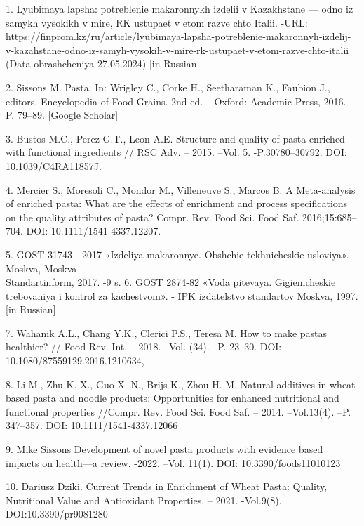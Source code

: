 \begin{noparindent}

1. Lyubimaya lapsha: potreblenie makaronnykh izdelii v Kazakhstane ---
odno iz samykh vysokikh v mire, RK ustupaet v etom razve chto Italii.
-URL:
https://finprom.kz/ru/article/lyubimaya-lapsha-potreblenie-makaronnyh-izdelij-v-kazahstane-odno-iz-samyh-vysokih-v-mire-rk-ustupaet-v-etom-razve-chto-italii
\\(Data obrashcheniya 27.05.2024) {[}in Russian{]}

2. Sissons M. Pasta. In: Wrigley C., Corke H., Seetharaman K., Faubion
J., editors. Encyclopedia of Food Grains. 2nd ed. -- Oxford: Academic
Press, 2016. - P. 79--89. {[}Google Scholar{]}

3. Bustos M.C., Perez G.T., Leon A.E. Structure and quality of pasta
enriched with functional ingredients // RSC Adv. -- 2015. --Vol. 5.
-P.30780--30792. DOI: 10.1039/C4RA11857J.

4. Mercier S., Moresoli C., Mondor M., Villeneuve S., Marcos B. A
Meta-analysis of enriched pasta: What are the effects of enrichment and
process specifications on the quality attributes of pasta? Compr. Rev.
Food Sci. Food Saf. 2016;15:685--704. DOI: 10.1111/1541-4337.12207.

5. GOST 31743---2017 «Izdeliya makaronnye. Obshchie tekhnicheskie
usloviya». --Moskva, Moskva \\Standartinform, 2017. -9 s. 6. GOST 2874-82
«Voda pit\textquotesingle evaya. Gigienicheskie trebovaniya i
kontrol\textquotesingle{} za kachestvom». - IPK
izdatel\textquotesingle stvo standartov Moskva, 1997. {[}in Russian{]}

7. Wahanik A.L., Chang Y.K., Clerici P.S., Teresa M. How to make pastas
healthier? // Food Rev. Int. -- 2018. --Vol. (34). --P. 23--30. DOI:
10.1080/87559129.2016.1210634,

8. Li M., Zhu K.-X., Guo X.-N., Brijs K., Zhou H.-M. Natural additives
in wheat-based pasta and noodle products: Opportunities for enhanced
nutritional and functional properties //Compr. Rev. Food Sci. Food Saf.
-- 2014. --Vol.13(4). --P. 347--357. DOI: 10.1111/1541-4337.12066

9. Mike Sissons Development of novel pasta products with evidence based
impacts on health---a review. -2022. --Vol. 11(1). DOI:
10.3390/foods11010123

10. Dariusz Dziki. Current Trends in Enrichment of Wheat Pasta: Quality,
Nutritional Value and Antioxidant Properties. -- 2021. -Vol.9(8).
DOI:10.3390/pr9081280


\end{noparindent}
